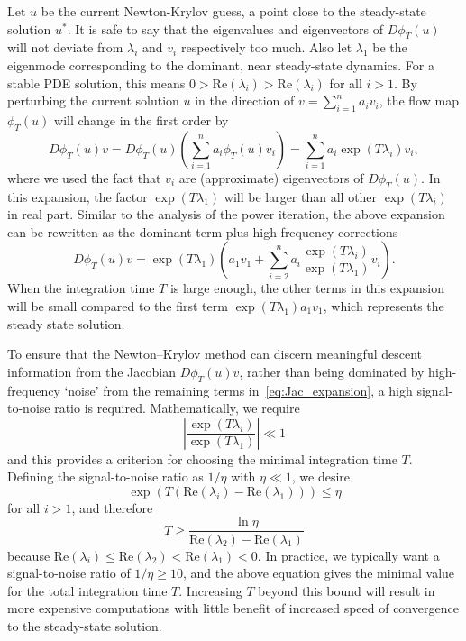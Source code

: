 \documentclass{article}
\begin{document}
Let $u$ be the current Newton-Krylov guess, a point close to the steady-state solution $u^*$. It is safe to say that the eigenvalues and eigenvectors of $D\phi_T(u)$ will not deviate from $\lambda_i$ and $v_i$ respectively too much. Also let $\lambda_1$ be the eigenmode corresponding to the dominant, near steady-state dynamics. For a stable PDE solution, this means $0 > \text{Re}(\lambda_i) > \text{Re}(\lambda_i)$ for all $i > 1$. By perturbing the current solution $u$ in the direction of $v = \sum_{i=1}^n a_i v_i$, the flow map $\phi_T(u)$ will change in the first order by
\begin{equation} \label{eq:Jac_expansion}
    D \phi_T(u) v = D \phi_T(u) \left(\sum_{i=1}^n  a_i \phi_T(u) v_i \right) = \sum_{i=1}^n a_i \exp(T \lambda_i) v_i,
\end{equation}
where we used the fact that $v_i$ are (approximate) eigenvectors of $D\phi_T(u)$. In this expansion, the factor $\exp(T \lambda_1)$ will be larger than all other $\exp(T \lambda_i)$ in real part. Similar to the analysis of the power iteration, the above expansion can be rewritten as the dominant term plus high-frequency corrections
\begin{equation}
     D \phi_T(u) v =  \exp(T \lambda_1)\left(a_1 v_1 + \sum_{i=2}^n a_i \frac{\exp(T \lambda_i)}{ \exp(T \lambda_1)} v_i \right).
\end{equation}
When the integration time $T$ is large enough, the other terms in this expansion will be small compared to the first term $\exp(T \lambda_1) a_1 v_1$, which represents the steady state solution. 

To ensure that the Newton–Krylov method can discern meaningful descent information from the Jacobian $D\phi_T(u) v$, rather than being dominated by high-frequency `noise' from the remaining terms in~\eqref{eq:Jac_expansion}, a high signal-to-noise ratio is required. Mathematically, we require
\begin{equation}
    \left|\frac{\exp(T \lambda_i)}{\exp(T \lambda_1)} \right|\ll 1
\end{equation}
and this provides a criterion for choosing the minimal integration time $T$. Defining the signal-to-noise ratio as $1/\eta$ with $\eta \ll 1$, we desire
\begin{equation*}
    \exp\left(T \left(\text{Re}(\lambda_i) - \text{Re}(\lambda_1)\right)\right) \leq \eta
\end{equation*}
 for all $i > 1$, and therefore
\begin{equation}
    T \geq \frac{\ln \eta}{\text{Re}(\lambda_2) - \text{Re}(\lambda_1)}
\end{equation}
because $\text{Re}(\lambda_i) \leq \text{Re}(\lambda_2) < \text{Re}(\lambda_1) < 0$. In practice, we typically want a signal-to-noise ratio of $1/\eta \geq 10$, and the above equation gives the minimal value for the total integration time $T$. Increasing $T$ beyond this bound will result in more expensive computations with little benefit of increased speed of convergence to the steady-state solution.
\end{document}
